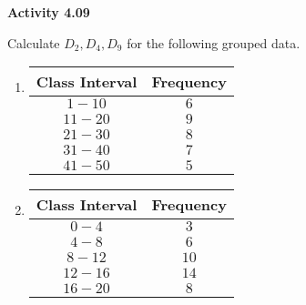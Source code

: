 \vspace{0.3ex}
\noindent\textbf{Activity 4.09}

\vspace{0.2ex}

Calculate \(D_2, D_4, D_9\) for the following grouped data.  
\begin{multicols}{2}
\begin{enumerate}
    \item 
    \begin{tabular}{|c|c|}
        \hline
        Class Interval & Frequency \\ \hline
        \(1 - 10\) & \(6\) \\ \hline
        \(11 - 20\) & \(9\) \\ \hline
        \(21 - 30\) & \(8\) \\ \hline
        \(31 - 40\) & \(7\) \\ \hline
        \(41 - 50\) & \(5\) \\ \hline
    \end{tabular}
    \item 
    \begin{tabular}{|c|c|}
        \hline
        Class Interval & Frequency \\ \hline
        \(0 - 4\) & \(3\) \\ \hline
        \(4 - 8\) & \(6\) \\ \hline
        \(8 - 12\) & \(10\) \\ \hline
        \(12 - 16\) & \(14\) \\ \hline
        \(16 - 20\) & \(8\) \\ \hline
    \end{tabular}
    \end{enumerate}
 \end{multicols}
